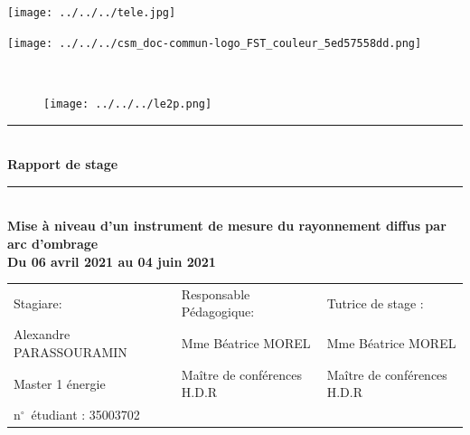 \documentclass[12pt,a4paper]{article}
\begin{document}
\begin{titlepage}
\begin{minipage}[c]{.46\linewidth}
     \begin{center}
         \texttt{[image: ../../../tele.jpg]}   
         
         \end{center}
   \end{minipage} \hfill
   \begin{minipage}[c]{.46\linewidth}
    \begin{center}
       \texttt{[image: ../../../csm\_doc-commun-logo\_FST\_couleur\_5ed57558dd.png]}    
        \end{center}
 \end{minipage}
\newcommand{\HRule}{\rule{\linewidth}{0.5mm}}
\center
\textsc{\LARGE} \\[3cm]

\begin{figure}[H]
\centering
\texttt{[image: ../../../le2p.png]} 
\end{figure}

\HRule \\[0.4cm]
{ \huge \bfseries Rapport de stage\\ [0.15cm] }
\HRule \\[1cm]

\textbf{ Mise à niveau d'un instrument de mesure du rayonnement diffus par arc d’ombrage}\\[1cm]
\textbf{ Du 06 avril 2021 au 04 juin 2021}\\[8cm]
\begin{tabular}{lll}
   \sf Stagiare: &\sf Responsable Pédagogique: &\sf Tutrice de stage : \\
  \sf Alexandre PARASSOURAMIN &\sf Mme Béatrice MOREL &\sf Mme Béatrice MOREL \\
   \sf Master 1 énergie& \sf Maître de conférences H.D.R & \sf Maître de conférences H.D.R\\
  \sf n$^\circ$~étudiant : 35003702& & \\
\end{tabular}




\end{titlepage}
\newpage
\thispagestyle{empty}
\end{document}
